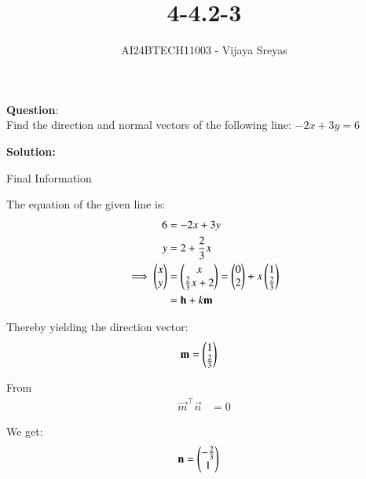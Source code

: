 \documentclass[journal]{IEEEtran}
\begin{document}

\vspace{3cm}

\title{4-4.2-3}
\author{AI24BTECH11003 - Vijaya Sreyas
}
{\let\newpage\relax\maketitle}

\renewcommand{\thefigure}{\theenumi}
\renewcommand{\thetable}{\theenumi}
\setlength{\intextsep}{10pt} %


\renewcommand{\thetable}{\theenumi}


\textbf{Question}:\\
Find the direction and normal vectors of the following line: $-2x+3y=6$

\textbf{Solution: }

\begin{table}[h!]    
  \centering
  
  \caption{Final Information}
  \label{4-4.2-3-tab-0}
\end{table}

The equation of the given line is:
\begin{align}
    6 &= -2x + 3y \\
    y &= 2 + \frac{2}{3}x \\
    \implies \begin{pmatrix}x \\ y\end{pmatrix} &= \begin{pmatrix}x \\ \frac{2}{3}x + 2\end{pmatrix} = \begin{pmatrix}0 \\ 2\end{pmatrix} + x\begin{pmatrix}1 \\ \frac{2}{3}\end{pmatrix} \\
    &= \mathbf{h} + k\mathbf{m}
\end{align}

Thereby yielding the direction vector:
\begin{align}
    \mathbf{m} &= \begin{pmatrix}1 \\ \frac{2}{3}\end{pmatrix} 
\end{align}

From
\begin{align}
    \vec{m}^{\top} \vec{n} &= 0
\end{align}

We get:
\begin{align}
    \mathbf{n} &= \begin{pmatrix}-\frac{2}{3} \\ 1\end{pmatrix}
\end{align}
\end{document}
